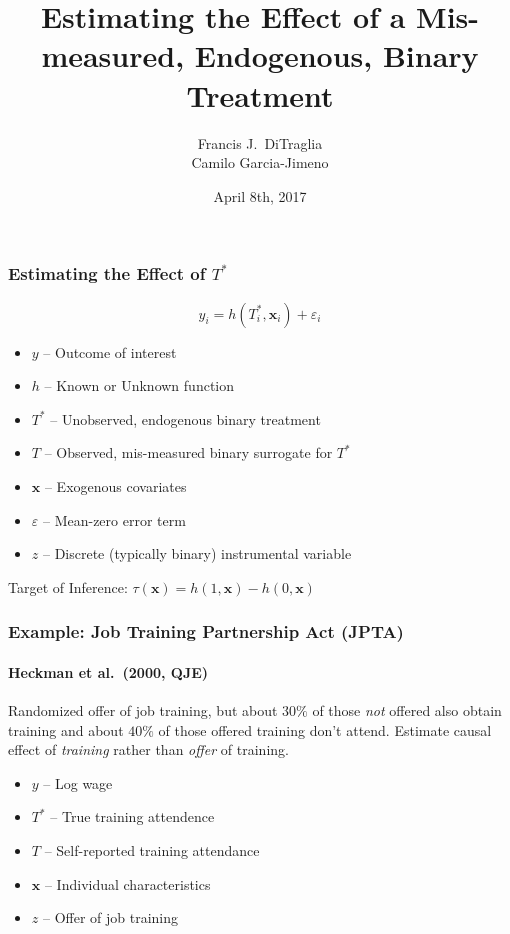 \documentclass{beamer}
\title[Binary Regressors]{Estimating the Effect of a Mis-measured, Endogenous, Binary Treatment}
\author[FJ DiTraglia]{Francis J.\ DiTraglia\\ Camilo Garcia-Jimeno}
\institute{University of Pennsylvania}
\date{April 8th, 2017}
\begin{document}
 

\begin{frame}[plain]
	\titlepage 
\end{frame} 
\begin{frame}
  \frametitle{Estimating the Effect of $T^*$}
  \vspace{-1em}
  \[ y_i = h(T^*_i, \mathbf{x}_i) + \varepsilon_i\]
  \vspace{-1.5em}
  \begin{itemize}
    \item $y$ -- Outcome of interest
    \item $h$ -- Known or Unknown function 
    \item $T^*$ -- Unobserved, endogenous binary treatment
    \item $T$ -- Observed, mis-measured binary surrogate for $T^*$
    \item $\mathbf{x}$ -- Exogenous covariates
    \item $\varepsilon$ -- Mean-zero error term
    \item $z$ -- Discrete (typically binary) instrumental variable
  \end{itemize}

  \begin{block}{Target of Inference: $\tau(\mathbf{x}) = h(1,\mathbf{x}) - h(0,\mathbf{x})$}
  \end{block}
\end{frame}
\begin{frame}
  \frametitle{Example: Job Training Partnership Act (JPTA)}
\framesubtitle{Heckman et al.\ (2000, QJE)}
Randomized offer of job training, but about $30\%$ of those \emph{not} offered also obtain training and about $40\%$ of those offered training don't attend. Estimate causal effect of \emph{training} rather than \emph{offer} of training.

\begin{itemize}
  \item $y$ -- Log wage 
  \item $T^*$ -- True training attendence
  \item $T$ -- Self-reported training attendance
  \item $\mathbf{x}$ -- Individual characteristics
  \item $z$ -- Offer of job training
\end{itemize}
   
\end{frame}
\end{document}
